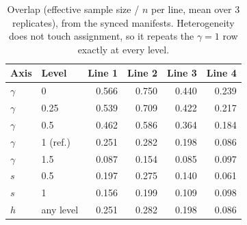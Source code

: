 \begin{table}[ht]
\centering\small
\caption{Overlap (effective sample size / $n$ per line, mean over 3 replicates), from the
synced manifests. Heterogeneity does not touch assignment, so it repeats the $\gamma=1$ row
exactly at every level.}
\label{tab:semisynthetic:overlap}
\begin{tabular}{@{}llrrrr@{}}
\toprule
Axis & Level & Line 1 & Line 2 & Line 3 & Line 4 \\
\midrule
$\gamma$ & 0        & 0.566 & 0.750 & 0.440 & 0.239 \\
$\gamma$ & 0.25      & 0.539 & 0.709 & 0.422 & 0.217 \\
$\gamma$ & 0.5       & 0.462 & 0.586 & 0.364 & 0.184 \\
$\gamma$ & 1 (ref.)  & 0.251 & 0.282 & 0.198 & 0.086 \\
$\gamma$ & 1.5       & 0.087 & 0.154 & 0.085 & 0.097 \\
$s$ & 0.5            & 0.197 & 0.275 & 0.140 & 0.061 \\
$s$ & 1               & 0.156 & 0.199 & 0.109 & 0.098 \\
$h$ & any level        & 0.251 & 0.282 & 0.198 & 0.086 \\
\bottomrule
\end{tabular}
\end{table}

